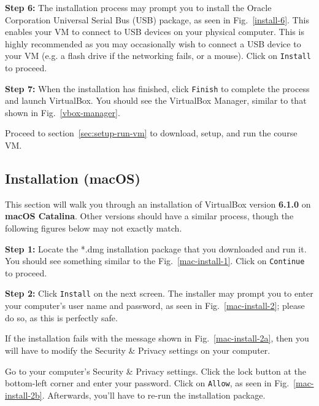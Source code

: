 \documentclass[11pt]{article}
\begin{document}
\textbf{Step 6:} The installation process may prompt you to install the Oracle Corporation Universal Serial Bus (USB) package, as seen in Fig.~\ref{install-6}. This enables your VM to connect to USB devices on your physical computer. This is highly recommended as you may occasionally wish to connect a USB device to your VM (e.g. a flash drive if the networking fails, or a mouse). Click on \texttt{Install} to proceed.

\textbf{Step 7:} When the installation has finished, click \texttt{Finish} to complete the process and launch VirtualBox. You should see the VirtualBox Manager, similar to that shown in Fig.~\ref{vbox-manager}.

Proceed to section~\ref{sec:setup-run-vm} to download, setup, and run the course VM.


\subsection{Installation (macOS)}
\label{subsec:install-osx}
This section will walk you through an installation of VirtualBox version \textbf{6.1.0} on \textbf{macOS Catalina}. Other versions should have a similar process, though the following figures below may not exactly match.

\textbf{Step 1:} Locate the *.dmg installation package that you downloaded and run it. You should see something similar to the Fig.~\ref{mac-install-1}. Click on \texttt{Continue} to proceed.

\textbf{Step 2:} Click \texttt{Install} on the next screen. The installer may prompt you to enter your computer's user name and password, as seen in Fig.~\ref{mac-install-2}; please do so, as this is perfectly safe.

If the installation fails with the message shown in Fig.~\ref{mac-install-2a}, then you will have to modify the Security \& Privacy settings on your computer.

Go to your computer's Security \& Privacy settings. Click the lock button at the bottom-left corner and enter your password. Click on \texttt{Allow}, as seen in Fig.~\ref{mac-install-2b}. Afterwards, you'll have to re-run the installation package.
\end{document}
